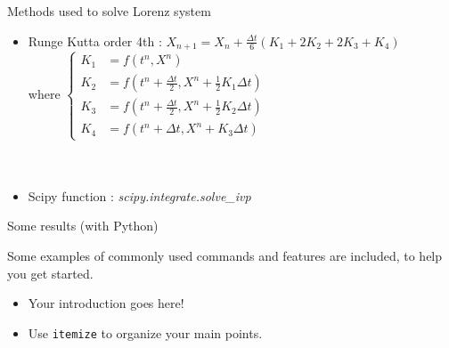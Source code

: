 \documentclass[10pt,xcolor={table,dvipsnames},t]{beamer}
\begin{document}
\begin{frame}[allowframebreaks]{Methods used to solve Lorenz system}
\begin{itemize}
        \item Runge Kutta order 4th : \qquad
        $X_{n+1}=X_n+\frac{\Delta t}{6}\left(K_1+2K_2+2K_3+K_4\right)$ \\
        where \qquad $\left\{\begin{aligned}
            K_1&=f(t^n,X^n) \\
            K_2&=f\left(t^n+\frac{\Delta t}{2},X^n+\frac{1}{2} K_1\Delta t\right) \\
            K_3&=f\left(t^n+\frac{\Delta t}{2},X^n+\frac{1}{2} K_2\Delta t\right) \\
            K_4&=f\left(t^n+\Delta t,X^n+K_3\Delta t\right)
        \end{aligned}\right.$ \\ \; \\ \; \\
        
        \item Scipy function : \qquad \textit{scipy.integrate.solve\_ivp}
    \end{itemize}

\end{frame}

\begin{frame}{Some results (with Python)}

    Some examples of commonly used commands and features are included, to help you get started.
    \begin{itemize}
      \item Your introduction goes here!
      \item Use \texttt{itemize} to organize your main points.
    \end{itemize}
    
\end{frame}
\end{document}

